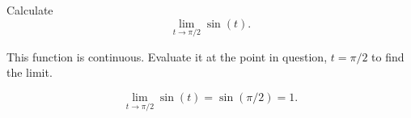 \documentclass{ximera}
\author{Emma Smith Zbarsky}
\begin{document}
\begin{exercise}

Calculate \[\lim_{t\to \pi/2} \sin(t).\]


\begin{hint}
This function is continuous. Evaluate it at the point in question,
$t=\pi/2$ to find the limit.
\end{hint}


\begin{hint}
\[\lim_{t\to \pi/2}\sin(t) = \sin(\pi/2) = 1.\]
\end{hint}


\begin{multipleChoice}
\choice{$\infty$}
\end{multipleChoice}

\end{exercise}
\end{document}
